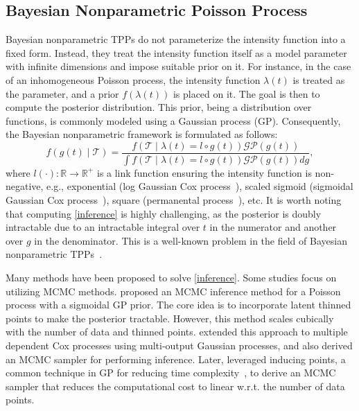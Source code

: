 \documentclass[10pt]{article} %
\begin{document}
\subsection{Bayesian Nonparametric Poisson Process}
\label{bayesian_poisson}
Bayesian nonparametric TPPs do not parameterize the intensity function into a fixed form. Instead, they treat the intensity function itself as a model parameter with infinite dimensions and impose suitable prior on it.  
For instance, in the case of an inhomogeneous Poisson process, the intensity function \(\lambda(t)\) is treated as the parameter, and a prior \(f(\lambda(t))\) is placed on it. The goal is then to compute the posterior distribution. This prior, being a distribution over functions, is commonly modeled using a Gaussian process (GP). 
Consequently, the Bayesian nonparametric framework is formulated as follows: 
\begin{equation}
    f(g(t) \mid \mathcal{T})=\frac{f(\mathcal{T}\mid \lambda(t)=l \circ g(t))\mathcal{GP}(g(t))}{\int f(\mathcal{T}\mid \lambda(t)=l \circ g(t))\mathcal{GP}(g(t))dg}, 
\label{inference}
\end{equation}
where \( l(\cdot): \mathbb{R} \to \mathbb{R}^+ \) is a link function ensuring the intensity function is non-negative, e.g., exponential (log Gaussian Cox process~\citep{moller1998log}), scaled sigmoid (sigmoidal Gaussian Cox process~\citep{adams2009tractable}), square (permanental process~\citep{mccullagh2006permanental}), etc. 
It is worth noting that computing \cref{inference} is highly challenging, as the posterior is doubly intractable due to an intractable integral over \(t\) in the numerator and another over \(g\) in the denominator. 
This is a well-known problem in the field of Bayesian nonparametric TPPs~\citep{murray2006mcmc}. 

Many methods have been proposed to solve \cref{inference}.  
Some studies focus on utilizing MCMC methods. 
\citet{adams2009tractable} proposed an MCMC inference method for a Poisson process with a sigmoidal GP prior. The core idea is to incorporate latent thinned points to make the posterior tractable. However, this method scales cubically with the number of data and thinned points. 
\citet{gunter2014efficient} extended this approach to multiple dependent Cox processes using multi-output Gaussian processes, and also derived an MCMC sampler for performing inference. 
Later, \citet{samo2015scalable} leveraged inducing points, a common technique in GP for reducing time complexity~\citep{titsias2009variational}, to derive an MCMC sampler that reduces the computational cost to linear w.r.t. the number of data points. 
\end{document}
